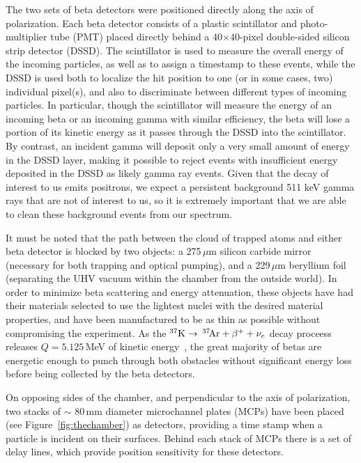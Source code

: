 	The two sets of beta detectors were positioned directly along the axis of polarization.  Each beta detector consists of a plastic scintillator and photo-multiplier tube (PMT)  placed directly behind a 40$\times$40-pixel double-sided silicon strip detector (DSSD).    The scintillator is used to measure the overall energy of the incoming particles, as well as to assign a timestamp to these events, while the DSSD is used both to localize the hit position to one (or in some cases, two) individual pixel(s), and also to discriminate between different types of incoming particles.  In particular, though the scintillator will measure the energy of an incoming beta or an incoming gamma with similar efficiency, the beta will lose a portion of its kinetic energy as it passes through the DSSD into the scintillator.  By contrast, an incident gamma will deposit only a very small amount of energy in the DSSD layer, making it possible to reject events with insufficient energy deposited in the DSSD as likely gamma ray events.  Given that the decay of interest to us emits positrons, we expect a persistent background 511 keV gamma rays that are not of interest to us, so it is extremely important that we are able to clean these background events from our spectrum. 


It must be noted that the path between the cloud of trapped atoms and either beta detector is blocked by two objects:  a 275$\,\mu$m silicon carbide mirror (necessary for both trapping and optical pumping), and a 229$\,\mu$m beryllium foil (separating the UHV vacuum within the chamber from the outside world).  In order to minimize beta scattering and energy attenuation, these objects have had their materials selected to use the lightest nuclei with the desired material properties, and have been manufactured to be as thin as possible without compromising the experiment.  As the $^{37}\textrm{K} \rightarrow \,^{37}\textrm{\!Ar} + \beta^{+} + \nu_e$ decay proceess releases $Q=5.125$\,MeV of kinetic energy~\cite{Q_value}, the great majority of betas are energetic enough to punch through both obstacles without significant energy loss before being collected by the beta detectors.  

On opposing sides of the chamber, and perpendicular to the axis of polarization, two stacks of $\sim$ 80\,mm diameter microchannel plates (MCPs) have been placed (see Figure~\ref{fig:thechamber}) as detectors, providing a time stamp when a particle is incident on their surfaces.  Behind each stack of MCPs there is a set of delay lines, which provide  position sensitivity for these detectors.   

